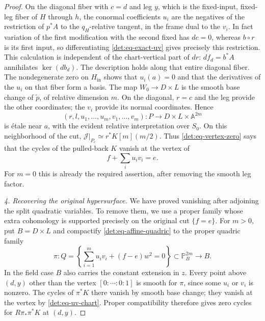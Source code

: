 \begin{proof}
On the diagonal fiber with $c=d$ and leg $y$, which is the fixed-input,
fixed-leg fiber of $H$ through $h$, the conormal coefficients
$u_i$ are the negatives of the restriction of $p^*A$ to the
$q_H$-relative tangent, in the frame dual to the $v_i$.  In fact variation
of the first modification with the second fixed has $dc=0$, whereas
$b\circ r$ is its first input, so differentiating
\eqref{det:eq-exact-uv} gives precisely this restriction.  This
calculation is independent of the chart-vertical part of $dr$:
$df_d=b^*A$ annihilates $\ker(db_d)$.
The description holds along that entire diagonal fiber.  The
nondegenerate zero on $H_{\mathrm{in}}$ shows that $u_i(a)=0$ and that the
derivatives of the $u_i$ on that fiber form a basis.  The map
$W_0\to D\times L$ is the smooth base change of $\widetilde p$,
of relative dimension $m$.  On the diagonal,
$r=c$ and the leg provide the other coordinates; the $v_i$ provide its
normal coordinates.  Hence
\begin{equation}\label{det:eq-uv-chart}
 (r,l,u_1,\ldots,u_m,v_1,\ldots,v_m):
 P\longrightarrow D\times L\times\mathbb A^{2m}
\end{equation}
is \'etale near $a$, with the evident relative interpretation over $S_0$.
On this neighborhood of the cut,
$\mathcal J|_{P_c}\simeq r^*K[m](m/2)$. Thus
\eqref{det:eq-vertex-zero} says that the cycles of the pulled-back $K$
vanish at the vertex of
\begin{equation}\label{det:eq-affine-quadric}
                         f+\sum_i u_i v_i=e.
\end{equation}
For $m=0$ this is already the required assertion, after removing the
smooth leg factor.

\smallskip\noindent
\emph{4. Recovering the original hypersurface.}
We have proved vanishing after adjoining the split quadratic variables.
To remove them, we use a proper family whose extra cohomology is
supported precisely on the original cut $\{f=e\}$.
For $m>0$, put $B=D\times L$ and compactify
\eqref{det:eq-affine-quadric} to the proper quadric family
\begin{equation}\label{det:eq-projective-quadric}
 \pi:Q=\left\{\sum_{i=1}^m u_i v_i+(f-e)w^2=0\right\}
               \subset\mathbb P^{2m}_B\longrightarrow B.
\end{equation}
In the field case $B$ also carries the constant extension in $z$.
Every point above $(d,y)$ other than the vertex $[0:\cdots:0:1]$ is
smooth for $\pi$, since some $u_i$ or $v_i$ is nonzero.  The cycles of
$\pi^*K$ there vanish by smooth base change; they vanish at the vertex
by \eqref{det:eq-uv-chart}.  Proper compatibility therefore gives
zero cycles for $R\pi_*\pi^*K$ at $(d,y)$.


\end{proof}
